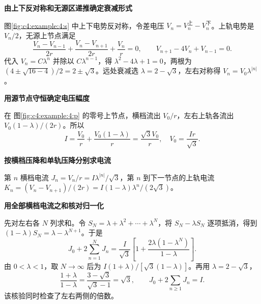 \begin{solution}\textbf{由上下反对称和无源区递推确定衰减形式}\par\nobreak
图\ref{fig:c4:example:4:s} 中上下电势反对称，令差电压 $V_n=V_n^{\text{上}}-V_n^{\text{下}}$。上轨电势是 $V_n/2$，无源上节点满足
\[
 \frac{V_n-V_{n-1}}{2r}+\frac{V_n-V_{n+1}}{2r}+\frac{V_n}{r}=0,
 \qquad V_{n+1}-4V_n+V_{n-1}=0.
\]
代入 $V_n=C\lambda^n$ 并除以 $C\lambda^{n-1}$，得 $\lambda^2-4\lambda+1=0$，两根为 $(4\pm\sqrt{16-4})/2=2\pm\sqrt3$。远处衰减选 $\lambda=2-\sqrt3$，左右对称得 $V_n=V_0\lambda^{|n|}$。



\par\medskip{}\noindent\textbf{用源节点守恒确定电压幅度}\par\nobreak
在 图\ref{fig:c4:example:4:p} 的零号上节点，横档流出 $V_0/r$，左右上轨各流出 $V_0(1-\lambda)/(2r)$。所以
\[
 I=\frac{V_0}{r}+\frac{V_0(1-\lambda)}r
 =\frac{\sqrt3V_0}{r},\quad V_0=\frac{Ir}{\sqrt3}.
\]


\par\medskip{}\noindent\textbf{按横档压降和单轨压降分别求电流}\par\nobreak
第 $n$ 横档电流 $J_n=V_n/r=I\lambda^{|n|}/\sqrt3$，第 $n$ 到下一节点的上轨电流 $K_n=(V_n-V_{n+1})/(2r)=I(1-\lambda)\lambda^n/(2\sqrt3)$。


\par\medskip{}\noindent\textbf{用全部横档电流之和核对归一化}\par\nobreak
先对左右各 $N$ 列求和。令 $S_N=\lambda+\lambda^2+\cdots+\lambda^N$，将 $S_N-\lambda S_N$ 逐项抵消，得到 $(1-\lambda)S_N=\lambda-\lambda^{N+1}$。于是
\[
 J_0+2\sum_{n=1}^NJ_n
 =\frac I{\sqrt3}\left[1+\frac{2\lambda(1-\lambda^N)}{1-\lambda}\right].
\]
由 $0<\lambda<1$，取 $N\to\infty$ 后为 $I(1+\lambda)/[\sqrt3(1-\lambda)]$。再用 $\lambda=2-\sqrt3$，
\[
 \frac{1+\lambda}{1-\lambda}
 =\frac{3-\sqrt3}{\sqrt3-1}=\sqrt3,
 \qquad J_0+2\sum_{n\ge1}J_n=I.
\]
该核验同时检查了左右两侧的倍数。\end{solution}
